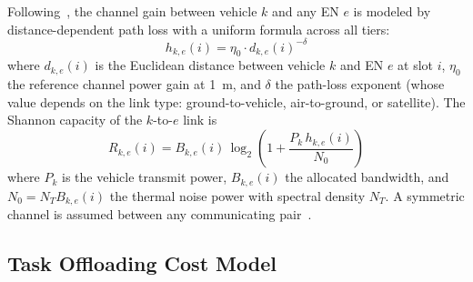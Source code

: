 \documentclass[11pt,a4paper]{article}
\theoremstyle{definition}
\begin{document}
Following~\cite{hrl_ntn}, the channel gain between vehicle $k$ and any EN $e$ is modeled by distance-dependent path loss with a uniform formula across all tiers:
\begin{equation}
  h_{k,e}(i) = \eta_0 \cdot d_{k,e}(i)^{-\delta}
  \label{eq:channel_gain}
\end{equation}
where $d_{k,e}(i)$ is the Euclidean distance between vehicle $k$ and EN $e$ at slot $i$, $\eta_0$ the reference channel power gain at 1~m, and $\delta$ the path-loss exponent (whose value depends on the link type: ground-to-vehicle, air-to-ground, or satellite). The Shannon capacity of the $k$-to-$e$ link is
\begin{equation}
  R_{k,e}(i) = B_{k,e}(i)\,\log_2\!\left(1 + \frac{P_k\,h_{k,e}(i)}{N_0}\right)
  \label{eq:shannon}
\end{equation}
where $P_k$ is the vehicle transmit power, $B_{k,e}(i)$ the allocated bandwidth, and $N_0 = N_T B_{k,e}(i)$ the thermal noise power with spectral density $N_T$. A symmetric channel is assumed between any communicating pair~\cite{hrl_ntn}.

\subsection{Task Offloading Cost Model}
\label{subsec:cost}
\end{document}
